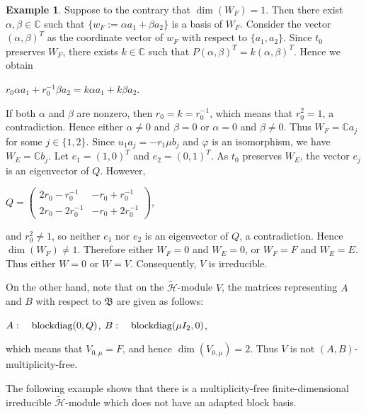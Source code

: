 \documentclass[reqno]{amsart}
\theoremstyle{definition}
\newtheorem{example}[theorem]{Example}
\begin{document}
\begin{example}
{Suppose to the contrary that $\dim(W_F) = 1$.
Then there exist $\alpha, \beta \in \mathbb{C}$ such that
$\{w_F:= \alpha a_1 + \beta a_2\}$ is a basis of $W_F$.
Consider the vector $(\alpha,\beta)^T$
as the coordinate vector of $w_F$ with respect to $\{a_1,a_2\}$.
Since $t_0$ preserves $W_F$, there exists $k \in \mathbb{C}$ such that
$P (\alpha,\beta)^T = k (\alpha,\beta)^T$.
Hence we obtain
\begin{center}
$r_0\alpha a_1 + r_0^{-1} \beta a_2 = k \alpha a_1 + k\beta a_2$.
\end{center}
If both $\alpha$ and $\beta$ are nonzero,
then $r_0 = k = r_0^{-1}$,
which means that $r_0^2 = 1$, a contradiction.
Hence either $\alpha \neq 0$ and $\beta = 0$ or
$\alpha = 0$ and $\beta \neq 0$.
Thus $W_F = \mathbb{C}a_j$ for some $j \in \{1,2\}$.
Since $u_1a_j = -r_1\mu b_j$ and $\varphi$ is an isomorphism,
we have $W_E = \mathbb{C}b_j$.
Let $e_1 = (1,0)^T$ and $e_2 = (0,1)^T$.
As $t_0$ preserves $W_E$,
the vector $e_j$ is an eigenvector of $Q$.
However,
\begin{center}
$Q = \begin{pmatrix}2r_0-r_0^{-1}&-r_0+r_0^{-1}\\2r_0-2r_0^{-1}&-r_0+2r_0^{-1}\end{pmatrix}$,
\end{center}
and $r_0^2 \neq 1$,
so neither $e_1$ nor $e_2$ is an eigenvector of $Q$, a contradiction.
Hence $\dim(W_F) \neq 1$.
Therefore either $W_F=0$ and $W_E=0$, or $W_F=F$ and $W_E=E$.
Thus either $W = 0$ or $W = V$.
Consequently, $V$ is irreducible.

On the other hand,
note that on the $\widetilde{\mathcal{H}}$-module $V$,
the matrices representing $A$ and $B$ with respect to $\mathfrak{B}$
are given as follows:
\begin{center}
$A : \quad {\rm blockdiag}(0,Q)$, \quad $B: \quad {\rm blockdiag}(\mu I_2,0)$,
\end{center}
which means that $V_{0,\mu} = F$,
and hence $\dim(V_{0,\mu}) = 2$.
Thus $V$ is not $(A,B)$-multiplicity-free.
}
%
\end{example}


The following example shows that there is a multiplicity-free finite-dimensional irreducible
$\widetilde{\mathcal{H}}$-module which does not have an adapted block basis.
\end{document}
